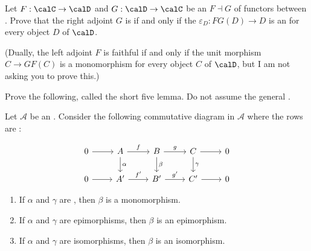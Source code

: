 \begin{problem}
    Let $F: \calC \to \calD$ and $G: \calD \to \calC$ be an  $F \dashv G$ of functors between . Prove that the right adjoint $G$ is  if and only if the  $\varepsilon_D: FG(D) \to D$ is an  for every object $D$ of $\calD$. 

    (Dually, the left adjoint $F$ is faithful if and only if the unit morphism $C \to GF(C)$ is a monomorphism for every object $C$ of $\calD$, but I am not asking you to prove this.)
\end{problem}



\begin{problem}
    Prove the following, called the short five lemma. Do not assume the general . 


    Let $\mathcal{A}$ be an . Consider the following commutative diagram in $\mathcal{A}$ where the rows are :

    \[
    \begin{tikzcd}
    0 \arrow[r] & A \arrow[r, "f"] \arrow[d, "\alpha"] & B \arrow[r, "g"] \arrow[d, "\beta"] & C \arrow[r] \arrow[d, "\gamma"] & 0 \\
    0 \arrow[r] & A' \arrow[r, "f'"] & B' \arrow[r, "g'"] & C' \arrow[r] & 0
    \end{tikzcd}
    \]
    \begin{enumerate}
        \item If $\alpha$ and $\gamma$ are , then $\beta$ is a monomorphism.
        \item If $\alpha$ and $\gamma$ are epimorphisms, then $\beta$ is an epimorphism.
        \item If $\alpha$ and $\gamma$ are isomorphisms, then $\beta$ is an isomorphism.
    \end{enumerate}
\end{problem}

